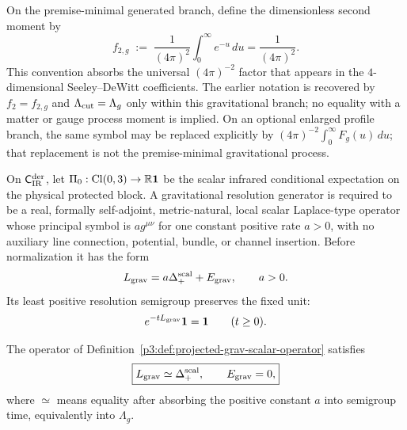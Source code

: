 \documentclass[12pt,a4paper]{article}
\begin{document}
\begin{definition}
\label{p3:def:f2_rescaled}
On the premise-minimal generated branch, define the dimensionless second
moment by
\begin{equation}
f_{2,g} \;:=\; \frac{1}{(4\pi)^2}\int_{0}^{\infty} e^{-u}\,du
=\frac1{(4\pi)^2}.
\label{p3:eq:f2_def}
\end{equation}
This convention absorbs the universal $(4\pi)^{-2}$ factor that appears in the $4$-dimensional
Seeley--DeWitt coefficients.  The earlier notation is recovered by
\(f_2=f_{2,g}\) and \(\Lambda_{\mathrm{cut}}=\Lambda_g\) only within this gravitational branch;
no equality with a matter or gauge process moment is implied.  On an optional
enlarged profile branch, the same symbol may be replaced explicitly by
\((4\pi)^{-2}\int_0^\infty F_g(u)\,du\); that replacement is not the
premise-minimal gravitational process.
\end{definition}


\begin{definition}
\label{p3:def:projected-grav-scalar-operator}
On \(\mathsf C_{\rm IR}^{\rm der}\), let
\(\Pi_0:\operatorname{Cl}(0,3)\to\mathbb R\mathbf1\) be the scalar infrared conditional
expectation on the physical protected block.  A gravitational resolution
generator is required to be a real, formally self-adjoint, metric-natural,
local scalar Laplace-type operator whose principal symbol is
\(a g^{\mu\nu}\) for one constant positive rate \(a>0\), with no auxiliary
line connection, potential, bundle, or channel insertion.  Before
normalization it has the form
\[
 L_{\rm grav}=a\Delta_+^{\rm scal}+E_{\rm grav},\qquad a>0.
\]
Its least positive resolution semigroup preserves the fixed unit:
\begin{equation}
\label{p3:eq:unit-preserving-grav-flow}
 e^{-tL_{\rm grav}}\mathbf1=\mathbf1
 \qquad(t\ge0).
\end{equation}
\end{definition}

\begin{lemma}
\label{p3:lem:scalar-remnant-laplacian}
The operator of Definition~\ref{p3:def:projected-grav-scalar-operator} satisfies
\begin{equation}
\label{p3:eq:scalar-remnant-E-zero}
 \boxed{L_{\rm grav}\simeq\Delta_+^{\rm scal},\qquad E_{\rm grav}=0,}
\end{equation}
where \(\simeq\) means equality after absorbing the positive constant \(a\)
into semigroup time, equivalently into \(\Lambda_g\).
\end{lemma}
\end{document}

